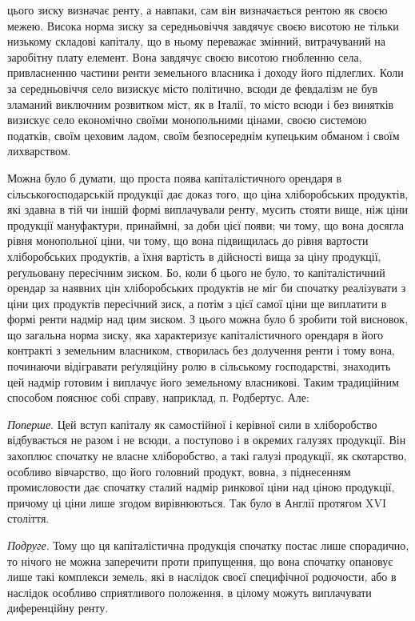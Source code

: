 \parcont{}  %
цього зиску визначає ренту, а навпаки, сам він визначається рентою як своєю
межею. Висока норма зиску за середньовіччя завдячує своєю висотою не тільки
низькому складові капіталу, що в ньому переважає змінний, витрачуваний на
заробітну плату елемент. Вона завдячує своєю висотою гнобленню села, привласненню
частини ренти земельного власника і доходу його підлеглих. Коли за
середньовіччя село визискує місто політично, всюди де февдалізм не був зламаний
виключним розвитком міст, як в Італії, то місто всюди і без винятків
визискує село економічно своїми монопольними цінами, своєю системою податків,
своїм цеховим ладом, своїм безпосереднім купецьким обманом і своїм
лихварством.

Можна було б думати, що проста поява капіталістичного орендаря в сільсько\dash{}господарській
продукції дає доказ того, що ціна хліборобських продуктів,
які здавна в тій чи іншій формі виплачували ренту, мусить стояти вище, ніж
ціни продукції мануфактури, принаймні, за доби цієї появи; чи тому, що
вона досягла рівня монопольної ціни, чи тому, що вона підвищилась до
рівня вартости хліборобських продуктів, а їхня вартість в дійсності вища за
ціну продукції, реґульовану пересічним зиском. Бо, коли б цього не було, то
капіталістичний орендар за наявних цін хліборобських продуктів не міг би
спочатку реалізувати з ціни цих продуктів пересічний зиск, а потім з цієї
самої ціни ще виплатити в формі ренти надмір над цим зиском. З цього можна
було б зробити той висновок, що загальна норма зиску, яка характеризує капіталістичного
орендаря в його контракті з земельним власником, створилась без
долучення ренти і тому вона, починаючи відігравати реґуляційну ролю в сільському
господарстві, знаходить цей надмір готовим і виплачує його земельному
власникові. Таким традиційним способом пояснює собі справу, наприклад,
п. Родбертус. Але:

\emph{Поперше}. Цей вступ капіталу як самостійної і керівної сили в хліборобство
відбувається не разом і не всюди, а поступово і в окремих галузях продукції.
Він захоплює спочатку не власне хліборобство, а такі галузі продукції,
як скотарство, особливо вівчарство, що його головний продукт, вовна, з піднесенням
промисловости дає спочатку сталий надмір ринкової ціни над ціною
продукції, причому ці ціни лише згодом вирівнюються. Так було в Англії протягом
XVI століття.

\emph{Подруге}. Тому що ця капіталістична продукція спочатку постає лише
спорадично, то нічого не можна заперечити проти припущення, що вона спочатку
опановує лише такі комплекси земель, які в наслідок своєї специфічної
родючости, або в наслідок особливо сприятливого положення, в цілому можуть
виплачувати диференційну ренту.

